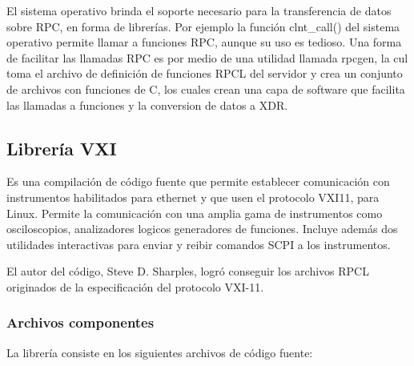 \documentclass[paper=letter,oneside,fontsize=11pt, parskip=full]{scrartcl}
\begin{document}
		El sistema operativo brinda el soporte necesario para la transferencia de datos sobre RPC, en forma de librerías. Por ejemplo la función clnt\_call() del sistema operativo permite llamar a funciones RPC, aunque su uso es tedioso. Una forma de facilitar las llamadas RPC es por medio de una utilidad llamada rpcgen, la cul toma el archivo de definición de funciones RPCL del servidor y crea un conjunto de archivos con funciones de C, los cuales crean una capa de software que facilita las llamadas a funciones y la conversion de datos a XDR.
		
		\subsection{Librería VXI}
		Es una compilación de código fuente que permite establecer comunicación con instrumentos habilitados para ethernet y que usen el protocolo VXI11, para Linux. Permite la comunicación con una amplia gama de instrumentos como osciloscopios, analizadores logicos generadores de funciones. Incluye además dos utilidades interactivas para enviar y reibir comandos SCPI a los instrumentos.
		
		El autor del código, Steve D. Sharples, logró conseguir los archivos RPCL originados de la especificación del protocolo VXI-11. 
		
		\subsubsection{Archivos componentes}
		La librería consiste en los siguientes archivos de código fuente:
		
\end{document}
